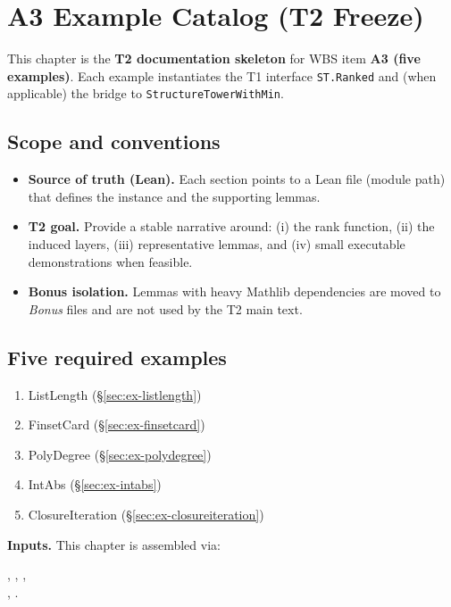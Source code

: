 \chapter{A3 Example Catalog (T2 Freeze)}
\label{ch:a3-examples}

This chapter is the \textbf{T2 documentation skeleton} for WBS item \textbf{A3 (five examples)}.
Each example instantiates the T1 interface
\texttt{ST.Ranked} and (when applicable) the bridge to \texttt{StructureTowerWithMin}.

\section{Scope and conventions}
\begin{itemize}
\item \textbf{Source of truth (Lean).} Each section points to a Lean file (module path) that
  defines the instance and the supporting lemmas.
\item \textbf{T2 goal.} Provide a stable narrative around:
  (i) the rank function, (ii) the induced layers, (iii) representative lemmas, and
  (iv) small executable demonstrations when feasible.
\item \textbf{Bonus isolation.} Lemmas with heavy Mathlib dependencies are moved to \emph{Bonus}
  files and are not used by the T2 main text.
\end{itemize}

\section{Five required examples}
\begin{enumerate}
\item ListLength (\S\ref{sec:ex-listlength})
\item FinsetCard (\S\ref{sec:ex-finsetcard})
\item PolyDegree (\S\ref{sec:ex-polydegree})
\item IntAbs (\S\ref{sec:ex-intabs})
\item ClosureIteration (\S\ref{sec:ex-closureiteration})
\end{enumerate}

\bigskip
\noindent
\textbf{Inputs.} This chapter is assembled via:
\begin{center}
\verb||, \verb||, \verb||,\\
\verb||, \verb||.
\end{center}






